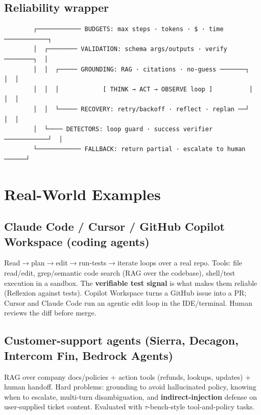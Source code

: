 \documentclass[11pt]{article}
\begin{document}
\subsection{Reliability wrapper}\label{reliability-wrapper}

\setcodelang{}

\begin{verbatim}
        ┌──────────── BUDGETS: max steps · tokens · $ · time ────────────┐
        │  ┌──────── VALIDATION: schema args/outputs · verify ────────┐  │
        │  │  ┌───── GROUNDING: RAG · citations · no-guess ───────┐   │  │
        │  │  │            [ THINK → ACT → OBSERVE loop ]          │   │  │
        │  │  └───── RECOVERY: retry/backoff · reflect · replan ──┘   │  │
        │  └──── DETECTORS: loop guard · success verifier ────────────┘  │
        └──────────── FALLBACK: return partial · escalate to human ──────┘
\end{verbatim}

\section{Real-World Examples}\label{real-world-examples}

\subsection{Claude Code / Cursor / GitHub Copilot Workspace (coding agents)}\label{claude-code--cursor--github-copilot-workspace-coding-agents}

Read\(\rightarrow\)plan\(\rightarrow\)edit\(\rightarrow\)run-tests\(\rightarrow\)iterate loops over a real repo. Tools: file read/edit, grep/semantic code search (RAG over the codebase), shell/test execution in a sandbox. The \textbf{verifiable test signal} is what makes them reliable (Reflexion against tests). Copilot Workspace turns a GitHub issue into a PR; Cursor and Claude Code run an agentic edit loop in the IDE/terminal. Human reviews the diff before merge.

\subsection{Customer-support agents (Sierra, Decagon, Intercom Fin, Bedrock Agents)}\label{customer-support-agents-sierra-decagon-intercom-fin-bedrock-agents}

RAG over company docs/policies + action tools (refunds, lookups, updates) + human handoff. Hard problems: grounding to avoid hallucinated policy, knowing when to escalate, multi-turn disambiguation, and \textbf{indirect-injection} defense on user-supplied ticket content. Evaluated with \(\tau\)-bench-style tool-and-policy tasks.
\end{document}
